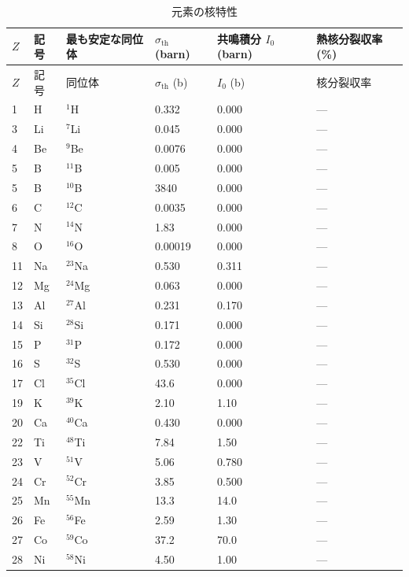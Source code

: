 \documentclass[11pt,a4paper]{article}
\theoremstyle{remark}
\begin{document}
	\begin{longtable}{p{0.8cm}p{1.2cm}p{2.0cm}p{2.5cm}p{2.5cm}p{2.5cm}}
		\caption{元素の核特性} \label{tab:nuclear-properties-func} \\
		\toprule
		\(Z\) & 記号 & 最も安定な同位体 & \(\sigma_{\text{th}}\) (barn) & 共鳴積分 \(I_0\) (barn) & 熱核分裂収率 (\%) \\
		\midrule
		\endfirsthead
		\toprule
		\(Z\) & 記号 & 同位体 & \(\sigma_{\text{th}}\) (b) & \(I_0\) (b) & 核分裂収率 \\
		\midrule
		\endhead
		1  & H  & \(^{1}\)H & 0.332 & 0.000 & --- \\
		3  & Li & \(^{7}\)Li & 0.045 & 0.000 & --- \\
		4  & Be & \(^{9}\)Be & 0.0076 & 0.000 & --- \\
		5  & B  & \(^{11}\)B & 0.005 & 0.000 & --- \\
		5  & B  & \(^{10}\)B & 3840 & 0.000 & --- \\
		6  & C  & \(^{12}\)C & 0.0035 & 0.000 & --- \\
		7  & N  & \(^{14}\)N & 1.83 & 0.000 & --- \\
		8  & O  & \(^{16}\)O & 0.00019 & 0.000 & --- \\
		11 & Na & \(^{23}\)Na & 0.530 & 0.311 & --- \\
		12 & Mg & \(^{24}\)Mg & 0.063 & 0.000 & --- \\
		13 & Al & \(^{27}\)Al & 0.231 & 0.170 & --- \\
		14 & Si & \(^{28}\)Si & 0.171 & 0.000 & --- \\
		15 & P  & \(^{31}\)P & 0.172 & 0.000 & --- \\
		16 & S  & \(^{32}\)S & 0.530 & 0.000 & --- \\
		17 & Cl & \(^{35}\)Cl & 43.6 & 0.000 & --- \\
		19 & K  & \(^{39}\)K & 2.10 & 1.10 & --- \\
		20 & Ca & \(^{40}\)Ca & 0.430 & 0.000 & --- \\
		22 & Ti & \(^{48}\)Ti & 7.84 & 1.50 & --- \\
		23 & V  & \(^{51}\)V & 5.06 & 0.780 & --- \\
		24 & Cr & \(^{52}\)Cr & 3.85 & 0.500 & --- \\
		25 & Mn & \(^{55}\)Mn & 13.3 & 14.0 & --- \\
		26 & Fe & \(^{56}\)Fe & 2.59 & 1.30 & --- \\
		27 & Co & \(^{59}\)Co & 37.2 & 70.0 & --- \\
		28 & Ni & \(^{58}\)Ni & 4.50 & 1.00 & --- \\

\end{longtable}
\end{document}
